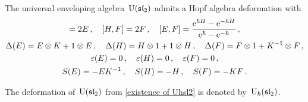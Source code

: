 \documentclass[a4paper, 11pt, oneside]{scrartcl}
\begin{document}
\begin{theorem}
  The universal enveloping algebra~$\operatorname{U}(\mathfrak{sl}_2)$ admits a Hopf algebra deformation with
  \begin{gather*}
    [H, E] = 2E \,,
    \quad
    [H, F] = 2F \,,
    \quad
    [E, F]
    =
    \frac{ \e^{\hbar H} - \e^{-\hbar H} }{ \e^{\hbar} - \e^{-\hbar} } \,,
    \\
    \Delta(E) = E \tensor K + 1 \tensor E \,,
    \quad
    \Delta(H) = H \tensor 1 + 1 \tensor H \,,
    \quad
    \Delta(F) = F \tensor 1 + K^{-1} \tensor F \,,
    \\
    \varepsilon(E) = 0 \,,
    \quad
    \varepsilon(H) = 0 \,,
    \quad
    \varepsilon(F) = 0 \,,
    \\
    S(E) = -E K^{-1} \,,
    \quad
    S(H) = -H \,,
    \quad
    S(F) = -K F \,.
  \end{gather*}
\end{theorem}

\begin{definition}
  The deformation of~$\operatorname{U}(\mathfrak{sl}_2)$ from \cref{existence of Uhsl2} is denoted by~$\operatorname{U}_{\hbar}(\mathfrak{sl}_2)$.
\end{definition}
\end{document}
